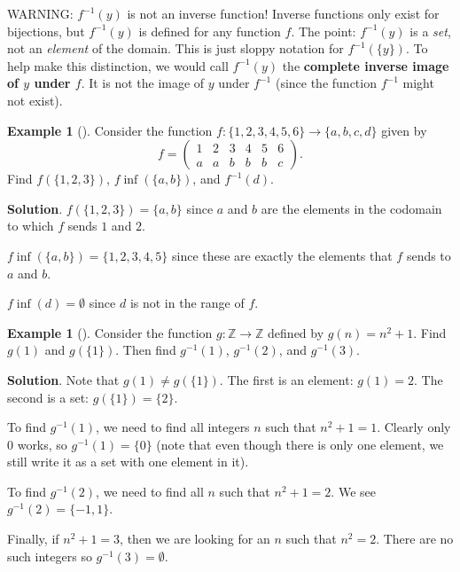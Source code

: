 \documentclass[10pt,]{book}
\newcommand{\terminology}[1]{\textbf{#1}}
\theoremstyle{plain}
\theoremstyle{definition}
\theoremstyle{definition}
\newtheorem{example}[theorem]{Example}
\theoremstyle{definition}
\theoremstyle{definition}
\numberwithin{equation}{chapter}
\def\Z{\mathbb Z}
\def\inv{^{-1}}
\newcommand{\amp}{&}
\begin{document}
\par
\hypertarget{p-1652}{}%
WARNING: \(f\inv(y)\) is not an inverse function! Inverse functions only exist for bijections, but \(f\inv(y)\) is defined for any function \(f\). The point: \(f\inv(y)\) is a \emph{set}, not an \emph{element} of the domain.  This is just sloppy notation for \(f\inv(\{y\})\).  To help make this distinction, we would call \(f\inv(y)\) the \terminology{complete inverse image of \(y\) under \(f\)}.  It is not the image of \(y\) under \(f\inv\) (since the function \(f\inv\) might not exist).%
\begin{example}[]\label{example-52}
\hypertarget{p-1653}{}%
Consider the function \(f:\{1,2,3,4,5,6\} \to \{a,b,c,d\}\) given by%
\begin{equation*}
f = \begin{pmatrix}1 \amp 2 \amp 3 \amp 4 \amp 5 \amp 6 \\ a \amp a \amp b \amp b \amp b \amp c\end{pmatrix}.
\end{equation*}
Find \(f(\{1,2,3\})\),  \(f\inf(\{a,b\})\), and \(f\inv(d)\).%
\par\smallskip%
\noindent\textbf{Solution}.\hypertarget{solution-145}{}\quad%
\hypertarget{p-1654}{}%
\(f(\{1,2,3\}) = \{a,b\}\) since \(a\) and \(b\) are the elements in the codomain to which \(f\) sends \(1\) and \(2\).%
\par
\hypertarget{p-1655}{}%
\(f\inf(\{a,b\}) = \{1,2,3,4,5\}\) since these are exactly the elements that \(f\) sends to \(a\) and \(b\).%
\par
\hypertarget{p-1656}{}%
\(f\inf(d) = \emptyset\) since \(d\) is not in the range of \(f\).%
\end{example}
\begin{example}[]\label{example-53}
\hypertarget{p-1657}{}%
Consider the function \(g:\Z \to \Z\) defined by \(g(n) = n^2 + 1\). Find \(g(1)\) and \(g(\{1\})\).  Then find \(g\inv(1)\), \(g\inv(2)\), and \(g\inv(3)\).%
\par\smallskip%
\noindent\textbf{Solution}.\hypertarget{solution-146}{}\quad%
\hypertarget{p-1658}{}%
Note that \(g(1) \ne g(\{1\})\).  The first is an element: \(g(1) = 2\).  The second is a set: \(g(\{1\}) = \{2\}\).%
\par
\hypertarget{p-1659}{}%
To find \(g\inv(1)\), we need to find all integers \(n\) such that \(n^2 + 1 = 1\). Clearly only 0 works, so \(g\inv(1) = \{0\}\) (note that even though there is only one element, we still write it as a set with one element in it).%
\par
\hypertarget{p-1660}{}%
To find \(g\inv(2)\), we need to find all \(n\) such that \(n^2 + 1 = 2\). We see \(g\inv(2) = \{-1,1\}\).%
\par
\hypertarget{p-1661}{}%
Finally, if \(n^2 + 1 = 3\), then we are looking for an \(n\) such that \(n^2 = 2\). There are no such integers so \(g\inv(3) = \emptyset\).%
\end{example}
\end{document}

